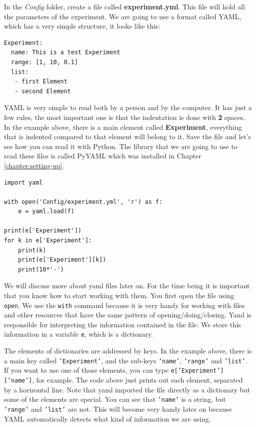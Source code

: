 In the \emph{Config} folder, create a file called \textbf{experiment.yml}. This file will hold all the parameters of the experiment. We are going to use a format called {YAML}, which has a very simple structure, it looks like this:

\begin{verbatim}
Experiment:
  name: This is a test Experiment
  range: [1, 10, 0.1]
  list:
   - first Element
   - second Element
\end{verbatim}

{YAML} is very simple to read both by a person and by the computer. It has just a few rules, the most important one is that the indentation is done with \textbf{2} spaces. In the example above, there is a main element called \textbf{Experiment}, everything that is indented compared to that element will belong to it. Save the file and let's see how you can read it with Python. The library that we are going to use to read these files is called PyYAML which was installed in Chapter \ref{chapter:setting-up}. 

\begin{verbatim}
import yaml

with open('Config/experiment.yml', 'r') as f:
    e = yaml.load(f)

print(e['Experiment'])
for k in e['Experiment']:
    print(k)
    print(e['Experiment'][k])
    print(10*'-')
\end{verbatim}

We will discuss more about yaml files later on. For the time being it is important that you know how to start working with them. You first open the file using \texttt{open}. We use the \texttt{with} command because it is very handy for working with files and other resources that have the same pattern of opening/doing/closing. Yaml is responsible for interpreting the information contained in the file. We store this information in a variable \texttt{e}, which is a dictionary. 

The elements of dictionaries are addressed by keys. In the example above, there is a main key called \texttt{'Experiment'}, and the
sub-keys \texttt{'name'}, \texttt{'range'} and \texttt{'list'}. If you want to use
one of those elements, you can type \texttt{e['Experiment']['name']}, for example. The code above just prints out each element,
separated by a horizontal line. Note that yaml imported the file directly as a dictionary but some of the elements are special. You can see that \texttt{'name'} is a string, but \texttt{'range'} and \texttt{'list'} are not. This will become very handy later on because YAML automatically detects what kind of information we are using. 

